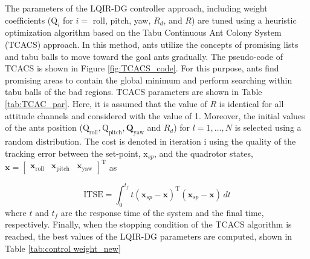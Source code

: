 \documentclass[3p]{elsarticle}
\begin{document}




The parameters of the LQIR-DG controller approach, including weight coefficients ($\boldsymbol{\mathrm{Q}}_i$ for $i=$ roll, pitch, yaw, $R_d$, and $R$) are tuned using a heuristic optimization algorithm based on the Tabu Continuous Ant Colony System (TCACS) \cite{article_TCACS} approach. In this method, ants utilize the concepts of promising lists and tabu balls to move toward the goal ants gradually. The pseudo-code of TCACS is shown in Figure \ref{fig:TCACS_code}. For this purpose, ants find promising areas to contain the global minimum and perform searching within tabu balls of the bad regions. TCACS parameters are shown in Table \ref{tab:TCAC_par}. Here, it is assumed that the value of $R$ is identical for all attitude channels and considered with the value of 1. Moreover, the initial values of the ants position ($ \boldsymbol{\mathrm{Q}}_{\text{roll}}, \boldsymbol{\mathrm{Q}}_{\text{pitch}}, \boldsymbol{{Q}}_{\text{yaw}}$ and $R_d$) for $l=1, \ldots, N$ is selected using a random distribution. The cost is denoted in iteration i using the quality of the tracking error between the set-point, $\boldsymbol{\mathrm{x}}_{sp}$, and the quadrotor states, $\boldsymbol{x} = \begin{bmatrix}
    \boldsymbol{x}_{\text{roll}} & \boldsymbol{x}_{\text{pitch}} & \boldsymbol{x}_{\text{yaw}}
\end{bmatrix}^{\mathrm{T}}$ as

\begin{equation}
    \text{ITSE} = \int_{0}^{t_f} t \left(
        \boldsymbol{x}_{sp} - \boldsymbol{x} 
        \right)^\mathrm{T} \left(\boldsymbol{x}_{sp} - \boldsymbol{x} \right) \, dt
\end{equation}
where $t$ and $t_f$ are the response time of the system and the final time, respectively. Finally, when the stopping condition of the TCACS algorithm is reached, the best values of the LQIR-DG parameters are computed, shown in Table \ref{tab:control weight_new}
\end{document}
